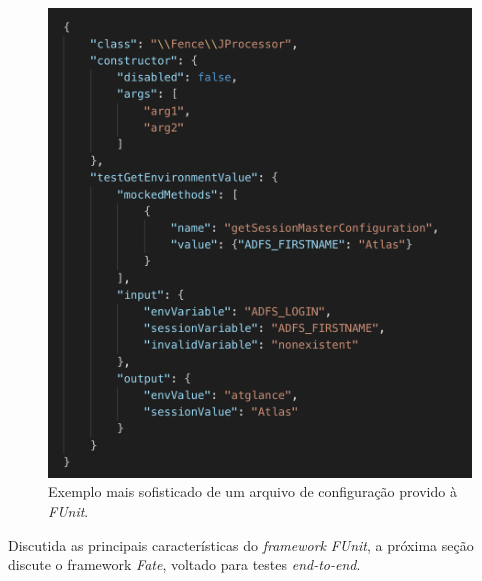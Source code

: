 \begin{figure}[H]
    \centering
    \includegraphics[width=13cm]{source/4-solucao/images/funcionalidades-add.png}
    \caption{Exemplo mais sofisticado de um arquivo de configuração provido à \emph{FUnit}.}
    \label{fig:funcionalidades-add}
\end{figure}

Discutida as principais características do \emph{framework} \emph{FUnit}, a próxima seção discute o framework \emph{Fate}, voltado para testes \emph{end-to-end}.
